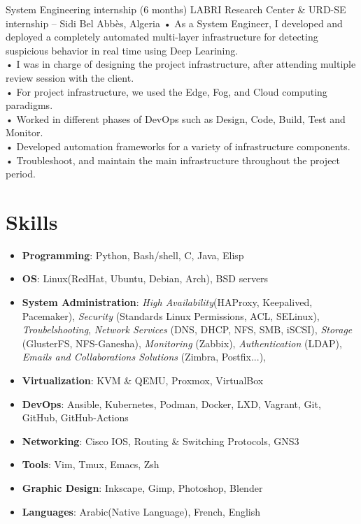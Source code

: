 \documentclass{cv}
\begin{document}
    {System Engineering internship (6 months)
    }
    {LABRI Research Center  \& URD-SE internship -- Sidi Bel Abbès, Algeria\vspace{.3cm}}
    {
      • As a System Engineer, I developed and deployed a completely automated multi-layer infrastructure 
      for detecting suspicious behavior in real time using Deep Learining.\\
      • I was in charge of designing the project infrastructure, after attending multiple review session 
      with the client.\\
      • For project infrastructure, we used the Edge, Fog, and Cloud computing paradigms.\\
      • Worked in different phases of DevOps such as Design, Code, Build, Test and Monitor.\\
      • Developed automation frameworks for a variety of infrastructure components.\\
      • Troubleshoot, and maintain the main infrastructure throughout the project period.\\
    }

\section{Skills}
\begin{itemize}
  \item{\bf{Programming}}: Python, Bash/shell, C, Java, Elisp 
  \item{\bf{OS}}: Linux(RedHat, Ubuntu, Debian, Arch), BSD servers
  \item{\bf{System Administration}}: 
    \emph{High Availability}(HAProxy, Keepalived, Pacemaker),
    \emph{Security} (Standards Linux Permissions, ACL, SELinux),
    \emph{Troubelshooting},
    \emph{Network Services} (DNS, DHCP, NFS, SMB, iSCSI),
    \emph{Storage} (GlusterFS, NFS-Ganesha),
    \emph{Monitoring} (Zabbix),
    \emph{Authentication} (LDAP),
    \emph{Emails and Collaborations Solutions} (Zimbra, Postfix...),

  \item{\bf{Virtualization}}: KVM \& QEMU, Proxmox, VirtualBox
  \item{\bf{DevOps}}: Ansible, Kubernetes, Podman, Docker, LXD, Vagrant, Git, GitHub, GitHub-Actions
  \item{\bf{Networking}}: Cisco IOS, Routing \& Switching Protocols, GNS3
  \item{\bf{Tools}}: Vim, Tmux, Emacs, Zsh
  \item{\bf{Graphic Design}}: Inkscape, Gimp, Photoshop, Blender
  \item{\bf{Languages}}: Arabic(Native Language), French, English

\end{itemize}
\end{document}
